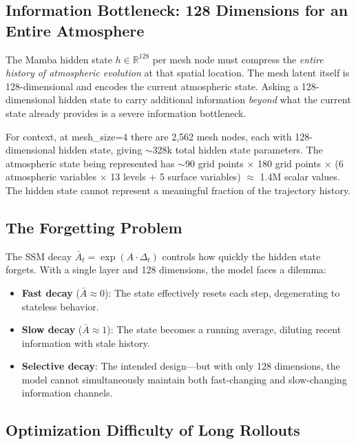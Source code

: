\documentclass[11pt,a4paper]{article}
\begin{document}
\subsection{Information Bottleneck: 128 Dimensions for an Entire Atmosphere}

The Mamba hidden state $h \in \mathbb{R}^{128}$ per mesh node must compress the \emph{entire history of atmospheric evolution} at that spatial location. The mesh latent itself is 128-dimensional and encodes the current atmospheric state. Asking a 128-dimensional hidden state to carry additional information \emph{beyond} what the current state already provides is a severe information bottleneck.

For context, at mesh\_size=4 there are 2,562 mesh nodes, each with 128-dimensional hidden state, giving $\sim$328k total hidden state parameters. The atmospheric state being represented has $\sim$90 grid points $\times$ 180 grid points $\times$ (6 atmospheric variables $\times$ 13 levels + 5 surface variables) $\approx$ 1.4M scalar values. The hidden state cannot represent a meaningful fraction of the trajectory history.

\subsection{The Forgetting Problem}

The SSM decay $\bar{A}_t = \exp(A \cdot \Delta_t)$ controls how quickly the hidden state forgets. With a single layer and 128 dimensions, the model faces a dilemma:
\begin{itemize}[nosep]
    \item \textbf{Fast decay} ($\bar{A} \approx 0$): The state effectively resets each step, degenerating to stateless behavior.
    \item \textbf{Slow decay} ($\bar{A} \approx 1$): The state becomes a running average, diluting recent information with stale history.
    \item \textbf{Selective decay}: The intended design---but with only 128 dimensions, the model cannot simultaneously maintain both fast-changing and slow-changing information channels.
\end{itemize}

\subsection{Optimization Difficulty of Long Rollouts}
\end{document}
